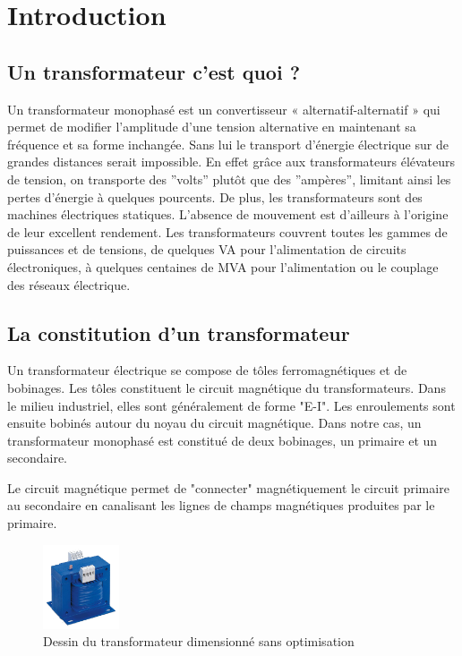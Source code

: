 \section{Introduction}


\subsection{Un transformateur c'est quoi ? }
	
	Un transformateur monophasé est un convertisseur « alternatif-alternatif » qui permet de modifier l'amplitude d'une tension alternative en maintenant sa fréquence et sa forme inchangée. Sans lui le transport d'énergie électrique sur de grandes distances serait impossible. En effet grâce aux transformateurs élévateurs de tension, on transporte des ''volts'' plutôt que des ''ampères'', limitant ainsi les pertes d'énergie à quelques pourcents. De plus, les transformateurs sont des machines électriques statiques. L'absence de mouvement est d'ailleurs à l'origine de leur excellent rendement. Les transformateurs couvrent toutes les gammes de puissances et de tensions, de quelques VA pour l'alimentation de circuits électroniques, à quelques centaines de MVA pour l'alimentation ou le couplage des réseaux électrique. 

\subsection{La constitution d'un transformateur}
	
	Un transformateur électrique se compose de tôles ferromagnétiques et de bobinages. Les tôles constituent le circuit magnétique du transformateurs. Dans le milieu industriel, elles sont généralement de forme "E-I". 
	Les enroulements sont ensuite bobinés autour du noyau du circuit magnétique. Dans notre cas, un transformateur monophasé est constitué de deux bobinages, un primaire et un secondaire. 

 	
	Le circuit magnétique permet de "connecter"  magnétiquement le circuit primaire au secondaire en canalisant les lignes de champs magnétiques produites par le primaire.

\begin{figure}[ht]
	\begin{center}
	\includegraphics[width=0.2\textwidth]{images/TP_intro_transfo}
	\caption{Dessin du transformateur dimensionné sans optimisation}\label{img:dessinTransfoCarre}
	\end{center}
\end{figure}
\FloatBarrier 


